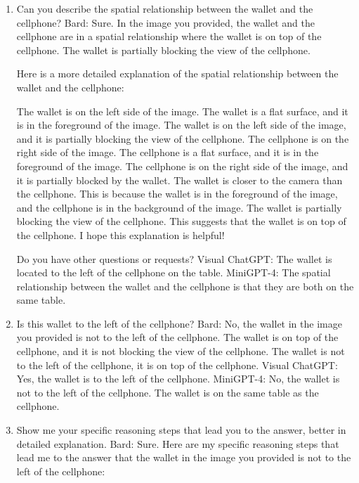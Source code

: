 \begin{enumerate}
    \item Can you describe the spatial relationship between the wallet and the cellphone?
    \subitem Bard: 
    Sure. In the image you provided, the wallet and the cellphone are in a spatial relationship where the wallet is on top of the cellphone. The wallet is partially blocking the view of the cellphone.

    Here is a more detailed explanation of the spatial relationship between the wallet and the cellphone:

    The wallet is on the left side of the image. The wallet is a flat surface, and it is in the foreground of the image. The wallet is on the left side of the image, and it is partially blocking the view of the cellphone.
    The cellphone is on the right side of the image. The cellphone is a flat surface, and it is in the foreground of the image. The cellphone is on the right side of the image, and it is partially blocked by the wallet.
    The wallet is closer to the camera than the cellphone. This is because the wallet is in the foreground of the image, and the cellphone is in the background of the image.
    The wallet is partially blocking the view of the cellphone. This suggests that the wallet is on top of the cellphone.
    I hope this explanation is helpful!

    Do you have other questions or requests?
    \subitem Visual ChatGPT: The wallet is located to the left of the cellphone on the table.
    \subitem MiniGPT-4: The spatial relationship between the wallet and the cellphone is that they are both on the same table.
    \item Is this wallet to the left of the cellphone?
    \subitem Bard: 
    No, the wallet in the image you provided is not to the left of the cellphone. The wallet is on top of the cellphone, and it is not blocking the view of the cellphone. The wallet is not to the left of the cellphone, it is on top of the cellphone.
    \subitem Visual ChatGPT: Yes, the wallet is to the left of the cellphone.
    \subitem MiniGPT-4: No, the wallet is not to the left of the cellphone. The wallet is on the same table as the cellphone.
    \item Show me your specific reasoning steps that lead you to the answer, better in detailed explanation.
    \subitem Bard: 
    Sure. Here are my specific reasoning steps that lead me to the answer that the wallet in the image you provided is not to the left of the cellphone:
    

\end{enumerate}
